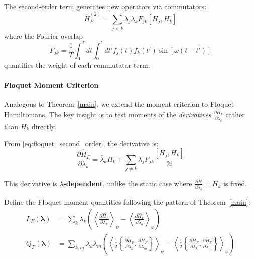 The second-order term generates new operators via commutators:
\begin{equation}
\hat{H}_F^{(2)} = \sum_{j<k} \lambda_j \lambda_k F_{jk} [H_j, H_k]
\label{eq:floquet_second_order}
\end{equation}
where the Fourier overlap
\begin{equation}
F_{jk} = \frac{1}{T} \int_0^T dt \int_0^t dt' f_j(t) f_k(t') \sin[\omega(t-t')]
\end{equation}
quantifies the weight of each commutator term.

\paragraph{Floquet Moment Criterion}

Analogous to Theorem~\ref{main}, we extend the moment criterion to Floquet Hamiltonians. The key insight is to test moments of the \emph{derivatives} $\frac{\partial \hat{H}_F}{\partial \lambda_k}$ rather than $H_k$ directly.

From \cref{eq:floquet_second_order}, the derivative is:
\begin{equation}
\frac{\partial \hat{H}_F}{\partial \lambda_k} = \bar{\lambda}_k H_k + \sum_{j \neq k} \lambda_j F_{jk} \frac{[H_j, H_k]}{2i}
\label{eq:floquet_derivative}
\end{equation}

This derivative is \textbf{$\lambda$-dependent}, unlike the static case where $\frac{\partial H}{\partial \lambda_k} = H_k$ is fixed.

Define the Floquet moment quantities following the pattern of Theorem~\ref{main}:
\begin{align}
L_F(\boldsymbol{\lambda}) &= \sum_k \lambda_k \left( \left\langle \frac{\partial \hat{H}_F}{\partial \lambda_k} \right\rangle_\psi - \left\langle \frac{\partial \hat{H}_F}{\partial \lambda_k} \right\rangle_\varphi \right) \\
Q_F(\boldsymbol{\lambda}) &= \sum_{k,m} \lambda_k \lambda_m \left( \left\langle \frac{1}{2}\left\{\frac{\partial \hat{H}_F}{\partial \lambda_k}, \frac{\partial \hat{H}_F}{\partial \lambda_m}\right\} \right\rangle_\psi - \left\langle \frac{1}{2}\left\{\frac{\partial \hat{H}_F}{\partial \lambda_k}, \frac{\partial \hat{H}_F}{\partial \lambda_m}\right\} \right\rangle_\varphi \right)
\end{align}

